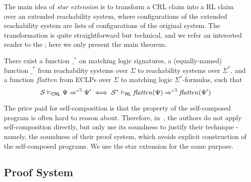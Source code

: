 The main idea of \emph{star extension} is to transform a CRL claim into a RL claim over an extended reachability system,
where configurations of the extended reachability system are lists of configurations of the original system.
The transformation is quite straightforward but technical, and we refer an interested reader to the ;
here we only present the main theorem.
\begin{theorem}\label{thm:CRLandRLcorrespondence}
  There exist a function $\_^*$ on matching logic signatures,
  a (equally-named) function $\_^*$ from reachability systems over $\Sigma$ to reachability systems over $\Sigma^*$,
  and a function $\mathit{flatten}$ from ECLPs over $\Sigma$ to matching logic $\Sigma^*$-formulas,
  such that
  \begin{equation*}
  \mathcal{S} \vDash_{\mathsf{CRL}} \Psi \Rightarrow^{c\exists} \Psi^\prime
    \iff \mathcal{S}^* \vDash_{\mathsf{RL}} \mathit{flatten}(\Psi) \Rightarrow^{c\exists} \mathit{flatten}(\Psi^\prime)
  \end{equation*}
\end{theorem}

The price paid for self-composition is that the property of the self-composed program is often hard to reason about.
Therefore, in~\cite{SousaD16}, the authors do not apply self-composition directly, but only use its soundness to justify
their technique - namely, the soundness of their proof system, which avoids explicit construction
of the self-composed programs.
We use the star extension for the same purpose.



\subsection{Proof System}






